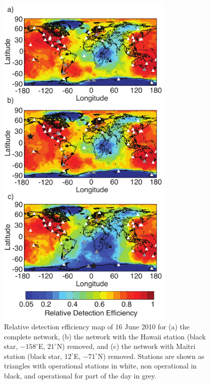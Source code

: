 \begin{figure}[ht!]
   \centering
\noindent\includegraphics[width=20pc]{efficiency/Figures/2012RS005049-p12.pdf}
   \caption{Relative detection efficiency map of 16 June 2010  for (a) the complete network, (b) the network with the Hawaii station (black star, $-158^\circ$E, $21^\circ$N) removed, and (c) the network with Maitri station (black star, $12^\circ$E, $-71^\circ$N) removed.
Stations are shown as triangles with operational stations in white, non operational in black, and operational for part of the day in grey.}
   \label{efficiency:fig:scrubMap}
\end{figure}

